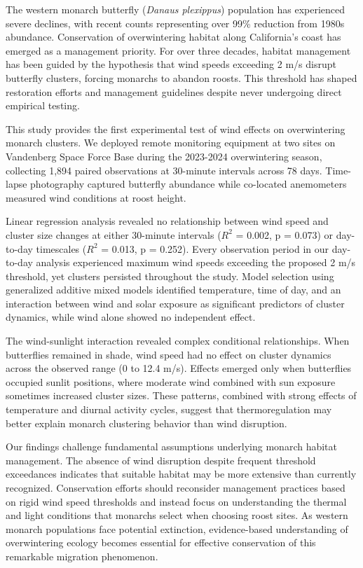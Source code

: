 The western monarch butterfly (\textit{Danaus plexippus}) population has experienced severe declines, with recent counts representing over 99\% reduction from 1980s abundance. Conservation of overwintering habitat along California's coast has emerged as a management priority. For over three decades, habitat management has been guided by the hypothesis that wind speeds exceeding 2 m/s disrupt butterfly clusters, forcing monarchs to abandon roosts. This threshold has shaped restoration efforts and management guidelines despite never undergoing direct empirical testing.

This study provides the first experimental test of wind effects on overwintering monarch clusters. We deployed remote monitoring equipment at two sites on Vandenberg Space Force Base during the 2023-2024 overwintering season, collecting 1,894 paired observations at 30-minute intervals across 78 days. Time-lapse photography captured butterfly abundance while co-located anemometers measured wind conditions at roost height.

Linear regression analysis revealed no relationship between wind speed and cluster size changes at either 30-minute intervals ($R^2$ = 0.002, p = 0.073) or day-to-day timescales ($R^2$ = 0.013, p = 0.252). Every observation period in our day-to-day analysis experienced maximum wind speeds exceeding the proposed 2 m/s threshold, yet clusters persisted throughout the study. Model selection using generalized additive mixed models identified temperature, time of day, and an interaction between wind and solar exposure as significant predictors of cluster dynamics, while wind alone showed no independent effect.

The wind-sunlight interaction revealed complex conditional relationships. When butterflies remained in shade, wind speed had no effect on cluster dynamics across the observed range (0 to 12.4 m/s). Effects emerged only when butterflies occupied sunlit positions, where moderate wind combined with sun exposure sometimes increased cluster sizes. These patterns, combined with strong effects of temperature and diurnal activity cycles, suggest that thermoregulation may better explain monarch clustering behavior than wind disruption.

Our findings challenge fundamental assumptions underlying monarch habitat management. The absence of wind disruption despite frequent threshold exceedances indicates that suitable habitat may be more extensive than currently recognized. Conservation efforts should reconsider management practices based on rigid wind speed thresholds and instead focus on understanding the thermal and light conditions that monarchs select when choosing roost sites. As western monarch populations face potential extinction, evidence-based understanding of overwintering ecology becomes essential for effective conservation of this remarkable migration phenomenon.